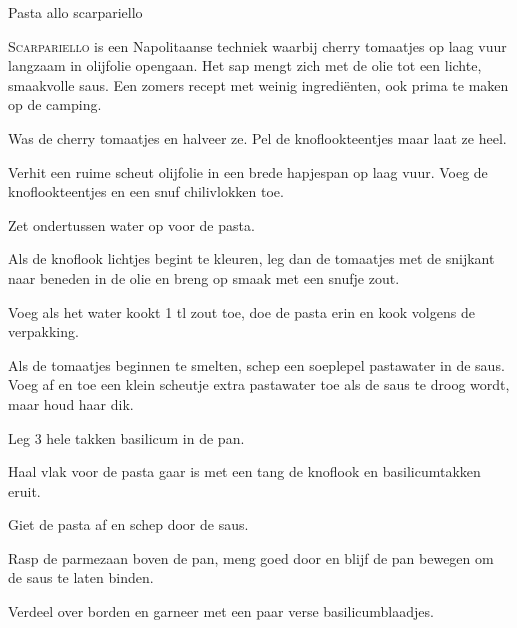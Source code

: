 \begin{recipe}{Pasta allo scarpariello}


\lettrine{S}{carpariello} is een Napolitaanse techniek waarbij cherry tomaatjes op laag
vuur langzaam in olijfolie opengaan. Het sap mengt zich met de olie tot een lichte,
smaakvolle saus. Een zomers recept met weinig ingrediënten, ook prima te maken op de camping.

\begin{ingredients}
\end{ingredients}

\begin{steps}
  \item Was de cherry tomaatjes en halveer ze. Pel de knoflookteentjes maar laat ze heel.
  \item Verhit een ruime scheut olijfolie in een brede hapjespan op laag vuur. Voeg de
        knoflookteentjes en een snuf chilivlokken toe.
  \item Zet ondertussen water op voor de pasta.
  \item Als de knoflook lichtjes begint te kleuren, leg dan de tomaatjes met de
        snijkant naar beneden in de olie en breng op smaak met een snufje zout.
  \item Voeg als het water kookt 1 tl zout toe, doe de pasta erin en kook
        volgens de verpakking.
  \item Als de tomaatjes beginnen te smelten, schep een soeplepel pastawater in de
        saus. Voeg af en toe een klein scheutje extra pastawater toe als de saus te
        droog wordt, maar houd haar dik.
  \item Leg 3 hele takken basilicum in de pan.
  \item Haal vlak voor de pasta gaar is met een tang de knoflook en basilicumtakken
        eruit.
  \item Giet de pasta af en schep door de saus.
  \item Rasp de parmezaan boven de pan, meng goed door en blijf de pan bewegen om de
        saus te laten binden.
  \item Verdeel over borden en garneer met een paar verse basilicumblaadjes.
\end{steps}

\end{recipe}

